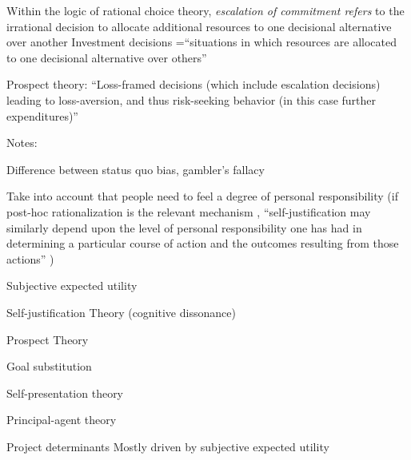 

Within the logic of rational choice theory, \textit{escalation of commitment refers} to the irrational decision to allocate additional  resources to one decisional alternative over another 
Investment decisions =\enquote{situations in which resources are allocated to one decisional alternative over others} \parencite[p. 28]{Staw1976}


Prospect theory: \enquote{Loss-framed decisions (which include escalation decisions) leading to loss-aversion, and thus risk-seeking behavior (in this case further expenditures)} \parencite[][p. 544]{Sleesman2012}




Notes:

Difference between status quo bias, gambler's fallacy

Take into account that people need to feel a degree of personal responsibility (if post-hoc rationalization is the relevant mechanism , \enquote{self-justification  may similarly depend upon the level of personal responsibility one has had in determining a particular course of action and the outcomes resulting from those actions} ) \parencite[][p. 30]{Staw1976}

Subjective expected utility \parencite[][]{Savage1972}


Self-justification Theory (cognitive dissonance) \parencite[][]{Aronson1968}\parencite[][]{Festinger1957}


Prospect Theory \parencite[][]{Kahneman1979}


Goal substitution \parencite[][]{Conlon1993}


Self-presentation theory \parencite[][]{Goffman1959}\parencite[][]{Jones1982}



Principal-agent theory \parencite[][]{Eisenhardt1989}\parencite[][]{Jensen1976} \parencite[][]{Ross1973}



Project determinants
Mostly driven by subjective expected utility \parencite[][p. 542]{Sleesman2012 } \textcite[see][]{Staw1987}


